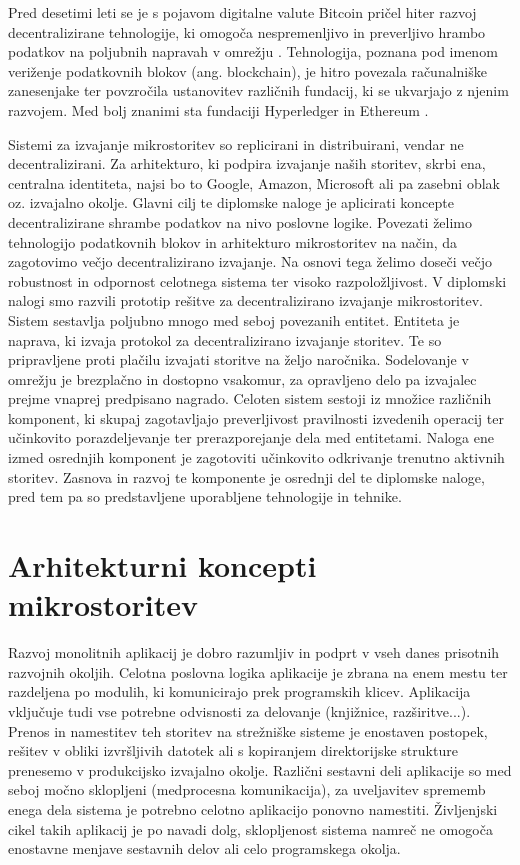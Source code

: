 \documentclass[a4paper, 12pt]{book}
\begin{document}
Pred desetimi leti se je s pojavom digitalne valute Bitcoin pričel hiter razvoj decentralizirane tehnologije, ki omogoča nespremenljivo in preverljivo hrambo podatkov na poljubnih napravah v omrežju \cite{nakamoto2008bitcoin}.
Tehnologija, poznana pod imenom veriženje podatkovnih blokov (ang. blockchain), je hitro povezala računalniške zanesenjake ter povzročila ustanovitev različnih fundacij, ki se ukvarjajo z njenim razvojem.
Med bolj znanimi sta fundaciji Hyperledger in Ethereum \cite{hyperledgerWeb, ethereumweb}.

Sistemi za izvajanje mikrostoritev so replicirani in distribuirani, vendar ne decentralizirani.
Za arhitekturo, ki podpira izvajanje naših storitev, skrbi ena, centralna identiteta, najsi bo to Google, Amazon, Microsoft ali pa zasebni oblak oz. izvajalno okolje.
Glavni cilj te diplomske naloge je aplicirati koncepte decentralizirane shrambe podatkov na nivo poslovne logike.
Povezati želimo tehnologijo podatkovnih blokov in arhitekturo mikrostoritev na način, da zagotovimo večjo decentralizirano izvajanje. 
Na osnovi tega želimo doseči večjo robustnost in odpornost celotnega sistema ter visoko razpoložljivost.
V diplomski nalogi smo razvili prototip rešitve za decentralizirano izvajanje mikrostoritev.
Sistem sestavlja poljubno mnogo med seboj povezanih entitet.
Entiteta je naprava, ki izvaja protokol za decentralizirano izvajanje storitev.
Te so pripravljene proti plačilu izvajati storitve na željo naročnika.
Sodelovanje v omrežju je brezplačno in dostopno vsakomur, za opravljeno delo pa izvajalec prejme vnaprej predpisano nagrado.
Celoten sistem sestoji iz množice različnih komponent, ki skupaj zagotavljajo preverljivost pravilnosti izvedenih operacij ter učinkovito porazdeljevanje ter prerazporejanje dela med entitetami.
Naloga ene izmed osrednjih komponent je zagotoviti učinkovito odkrivanje trenutno aktivnih storitev.
Zasnova in razvoj te komponente je osrednji del te diplomske naloge, pred tem pa so predstavljene uporabljene tehnologije in tehnike.

\chapter{Arhitekturni koncepti mikrostoritev}
\label{ch1}

Razvoj monolitnih aplikacij je dobro razumljiv in podprt v vseh danes prisotnih razvojnih okoljih.
Celotna poslovna logika aplikacije je zbrana na enem mestu ter razdeljena po modulih, ki komunicirajo prek programskih klicev.
Aplikacija vključuje tudi vse potrebne odvisnosti za delovanje (knjižnice, razširitve...).
Prenos in namestitev teh storitev na strežniške sisteme je enostaven postopek, rešitev v obliki izvršljivih datotek ali s kopiranjem direktorijske strukture prenesemo v produkcijsko izvajalno okolje.
Različni sestavni deli aplikacije so med seboj močno sklopljeni (medprocesna komunikacija), za uveljavitev sprememb enega dela sistema je potrebno celotno aplikacijo ponovno namestiti.
Življenjski cikel takih aplikacij je po navadi dolg, sklopljenost sistema namreč ne omogoča enostavne menjave sestavnih delov ali celo programskega okolja.
\end{document}
